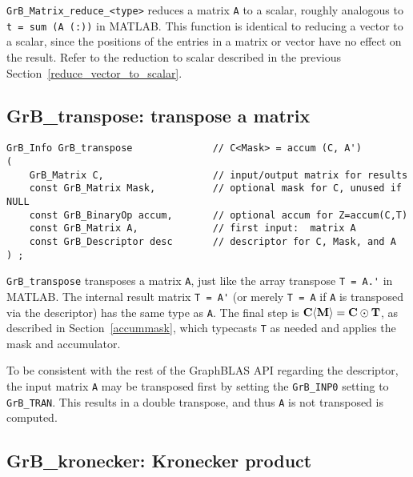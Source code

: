 \documentclass[12pt]{article}
\begin{document}
\verb'GrB_Matrix_reduce_<type>' reduces a matrix \verb'A' to a scalar, roughly
analogous to \verb't = sum (A (:))' in MATLAB.  This function is identical to
reducing a vector to a scalar, since the positions of the entries in a matrix
or vector have no effect on the result.  Refer to the reduction to scalar
described in the previous Section~\ref{reduce_vector_to_scalar}.

\newpage
\subsection{{\sf GrB\_transpose:} transpose a matrix} %
\label{transpose}

\begin{mdframed}[userdefinedwidth=6in]
{\footnotesize
\begin{verbatim}
GrB_Info GrB_transpose              // C<Mask> = accum (C, A')
(
    GrB_Matrix C,                   // input/output matrix for results
    const GrB_Matrix Mask,          // optional mask for C, unused if NULL
    const GrB_BinaryOp accum,       // optional accum for Z=accum(C,T)
    const GrB_Matrix A,             // first input:  matrix A
    const GrB_Descriptor desc       // descriptor for C, Mask, and A
) ;
\end{verbatim} } \end{mdframed}

\verb'GrB_transpose'
transposes a matrix \verb'A', just like the array transpose \verb"T = A.'" in
MATLAB.  The internal result matrix \verb"T = A'" (or merely \verb"T = A" if
\verb'A' is transposed via the descriptor) has the same type as \verb'A'.  The
final step is ${\bf C \langle M \rangle  = C \odot T}$, as described in
Section~\ref{accummask}, which typecasts \verb'T' as needed and applies the
mask and accumulator.

To be consistent with the rest of the GraphBLAS API regarding the
descriptor, the input matrix \verb'A' may be transposed first by
setting the \verb'GrB_INP0' setting to \verb'GrB_TRAN'.  This results in
a double transpose, and thus \verb'A' is not transposed is computed.

\newpage
\subsection{{\sf GrB\_kronecker:} Kronecker product} %
\label{kron}
\end{document}
